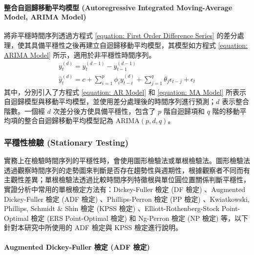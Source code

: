 \paragraph{整合自迴歸移動平均模型 (Autoregressive Integrated Moving-Average Model, ARIMA Model)}

將非平穩時間序列透過方程式 \eqref{equation: First Order Difference Series} 的差分處理，使其具備平穩性之後再建立自迴歸移動平均模型，其模型如方程式 \eqref{equation: ARIMA Model} 所示，適用於非平穩性時間序列。
%
\begin{gather}
  \label{equation: First Order Difference Series}
  {y}_{t}^{(d)} = y_{t}^{(d-1)} - y_{t-1}^{(d-1)} \\[1em]
  \label{equation: ARIMA Model}
  \hat{y}_{t}^{(d)} = c + \sum_{i = 1}^{p} \phi_{i} {y}_{t-i}^{(d)} + \sum_{j = 1}^{q} \theta_{j} \epsilon_{t-j} + \epsilon_{t}
\end{gather}
%
其中，分別引入了方程式 \eqref{equation: AR Model} 和 \eqref{equation: MA Model} 所表示自迴歸模型與移動平均模型，並使用差分處理後的時間序列進行預測；$d$ 表示整合階數。一個經 $d$ 次差分後方使具備平穩性，包含了 $p$ 階自迴歸項和 $q$ 階的移動平均項的整合自迴歸移動平均模型記為 $\text{ARIMA} (p, d, q)$。

\subsubsection{平穩性檢驗 (Stationary Testing)}

實務上在檢驗時間序列的平穩性時，會使用圖形檢驗法或單根檢驗法。圖形檢驗法透過觀察時間序列的走勢圖來判斷是否存在趨勢性與週期性，根據觀察者不同而有主觀性差異；單根檢驗法透過比較時間序列特徵根與單位圓位置關係判斷平穩性，實證分析中常用的單根檢定方法有：Dickey-Fuller 檢定 (DF 檢定) 、Augmented Dickey-Fuller 檢定 (ADF 檢定) 、Phillips-Perron 檢定 (PP 檢定) 、Kwiatkowski, Phillips, Schmidt \& Shin 檢定 (KPSS 檢定) 、Elliott-Rothenberg-Stock Point-Optimal 檢定 (ERS Point-Optimal 檢定) 和 Ng-Perron 檢定 (NP 檢定) 等，以下針對本研究中所使用的 ADF 檢定與 KPSS 檢定進行說明。

\paragraph{Augmented Dickey-Fuller 檢定 (ADF 檢定)}

